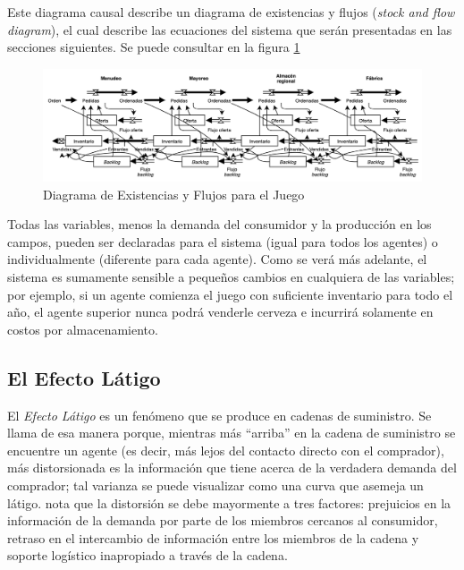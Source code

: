 Este diagrama causal describe un diagrama de existencias y flujos (\textit{stock and flow diagram}), el cual describe las ecuaciones del sistema que ser\'an presentadas en las secciones siguientes. Se puede consultar en la figura \ref{stockflow}

\begin{figure}[ht]
\caption{Diagrama de Existencias y Flujos para el Juego}
\label{stockflow}
\includegraphics[width=14cm]{tesis_tex/figs/beer_distribution_game_stock_flow.PNG}
\centering
\end{figure}

Todas las variables, menos la demanda del consumidor y la producci\'on en los campos, pueden ser declaradas para el sistema (igual para todos los agentes) o individualmente (diferente para cada agente). Como se ver\'a m\'as adelante, el sistema es sumamente sensible a peque\~nos cambios en cualquiera de las variables; por ejemplo, si un agente comienza el juego con suficiente inventario para todo el a\~no, el agente superior nunca podr\'a venderle cerveza e incurrir\'a solamente en costos por almacenamiento.

\subsection{El Efecto Látigo}

El \textit{Efecto Látigo} es un fen\'omeno que se produce en cadenas de suministro. Se llama de esa manera porque, mientras m\'as ``arriba'' en la cadena de suministro se encuentre un agente (es decir, m\'as lejos del contacto directo con el comprador), m\'as distorsionada es la informaci\'on que tiene acerca de la verdadera demanda del comprador; tal varianza se puede visualizar como una curva que asemeja un l\'atigo. \citet{Chaharsooghi} nota que la distorsi\'on se debe mayormente a tres factores: prejuicios en la informaci\'on de la demanda por parte de los miembros cercanos al consumidor, retraso en el intercambio de informaci\'on entre los miembros de la cadena y soporte log\'istico inapropiado a trav\'es de la cadena. \\

